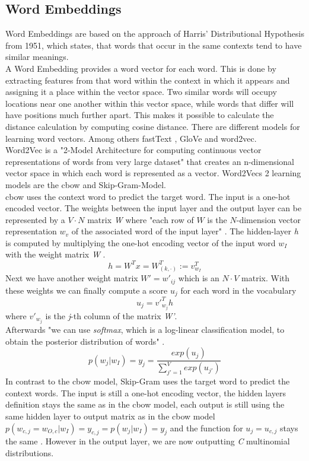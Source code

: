 \documentclass[a4paper, 11pt,titlepage,oneside,openany]{book}
\begin{document}
\subsection{Word Embeddings}
Word Embeddings are based on the approach of Harris' Distributional Hypothesis \cite{distributionalhypothesis} from 1951, which states, that words that occur in the same contexts tend to have similar meanings. \\
\noindent A Word Embedding provides a word vector for each word. This is done by extracting features from that word within the context in which it appears and assigning it a place within the vector space. Two similar words will occupy locations near one another within this vector space, while words that differ will have positions much further apart. This makes it possible to calculate the distance calculation by computing cosine distance. There are different models for learning word vectors. Among others fastText \cite{fasttext}, GloVe \cite{glove} and word2vec. \\

Word2Vec is a "2-Model Architecture for computing continuous vector representations of words from very large dataset"\cite{effiecientestimation} that creates an n-dimensional vector space in which each word is represented as a vector. Word2Vecs 2 learning models are the \gls{cbow} and Skip-Gram-Model.\\
\noindent \gls{cbow} uses the context word to predict the target word. The input is a one-hot encoded vector. The weights between the input layer and the output layer can be represented by a $V \cdot N$ matrix \textit{W} where "each row of $W$ is the $N$-dimension vector representation $w_v$ of the associated word of the input layer" \cite{word2vecparam}. The hidden-layer \textit{h} is computed by multiplying the one-hot encoding vector of the input word $w_I$ with the weight matrix \textit{W} \cite{word2vecparam}.
\[
h=W^Tx=W_{(k, \cdot)}^{T}:=v_{w_I}^{T}
\] 
Next we have another weight matrix $W'={w'_{ij}}$ which is an $N \cdot V$ matrix. With these weights we can finally compute a score $u_j$ for each word in the vocabulary \cite{word2vecparam}
\[
u_{j}={v'}_{w_j}^{T}h
\] where ${v'}_{w_j}$ is the \textit{j}-th column of the matrix \textit{W'}. \\

\noindent Afterwards "we can use \textit{softmax}, which is a log-linear classification model, to obtain the posterior distribution of words" \cite{word2vecparam}.
\[
p(w_j|w_I)=y_j=\frac{exp(u_j)}{\sum_{j'=1}^V exp(u_{j'})}
\] 
\noindent In contrast to the \gls{cbow} model,  Skip-Gram uses the target word to predict the context words. The input is still a one-hot encoding vector, the hidden layers definition stays the same as in the \gls{cbow} model, each output is still using the same hidden layer to output matrix as in the \gls{cbow} model $p(w_{c,j}=w_{O,c}|w_I)=y_{c,j} = p(w_j|w_I)=y_j$ and the function for $u_j=u_{c,j}$ stays the same \cite{word2vecparam}. However in the output layer, we are now outputting \textit{C} multinomial distributions. 
\end{document}
